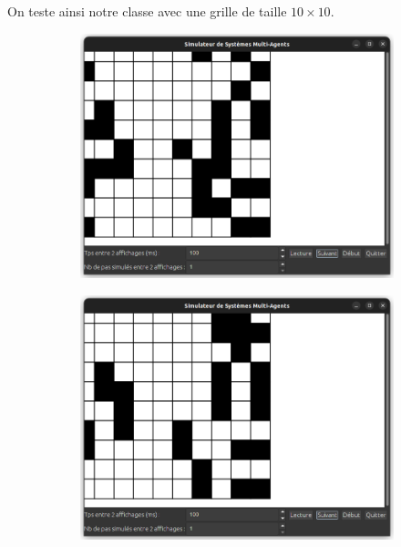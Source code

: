 \documentclass[a4paper, 11pt, french]{article}
\begin{document}
On teste ainsi notre classe avec une grille de taille $10 \times 10$.

\begin{figure}[H]
\centering
\begin{subfigure}{0.3\textwidth}
    \includegraphics[width=\textwidth]{TestConway1.png}
\end{subfigure}
\hfill
\begin{subfigure}{0.3\textwidth}
    \includegraphics[width=\textwidth]{TestConway2.png}
\end{subfigure}
\hfill
\begin{subfigure}{0.3\textwidth}

\end{subfigure}
\end{figure}
\end{document}
